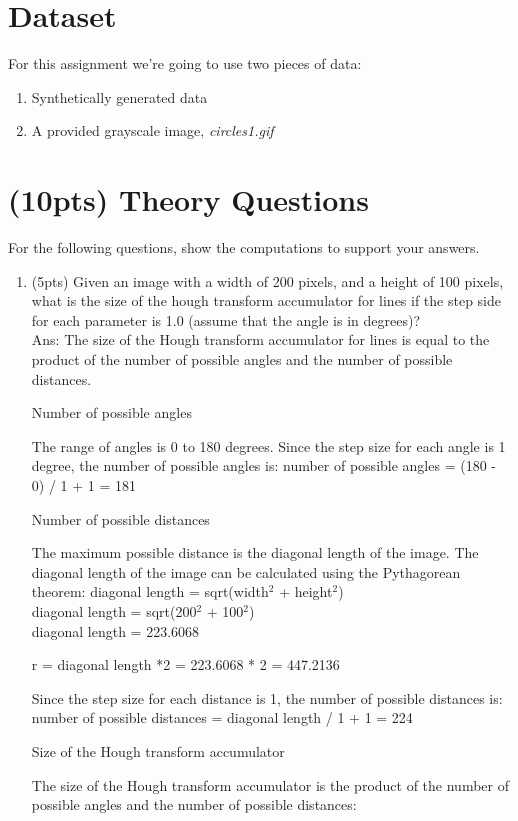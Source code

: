 \documentclass[12pt]{article}
\begin{document}
\newpage
\section*{Dataset}
For this assignment we're going to use two pieces of data:
\begin{enumerate}
\item Synthetically generated data
\item A provided grayscale image,  \emph{circles1.gif}
\end{enumerate}

\newpage
\section{(10pts) Theory Questions}
\noindent
For the following questions, show the computations to support your answers.
\begin{enumerate}
\item (5pts) Given an image with a width of 200 pixels, and a height of 100 pixels, what is the size of the hough transform accumulator for lines if the step side for each parameter is 1.0 (assume that the angle is in degrees)?\\
Ans: The size of the Hough transform accumulator for lines is equal to the product of the number of possible angles and the number of possible distances.

Number of possible angles

The range of angles is 0 to 180 degrees. Since the step size for each angle is 1 degree, the number of possible angles is:
number of possible angles = (180 - 0) / 1 + 1 = 181

Number of possible distances

The maximum possible distance is the diagonal length of the image. The diagonal length of the image can be calculated using the Pythagorean theorem:
diagonal length = sqrt(width$^2$ + height$^2$)\\
diagonal length = sqrt(200$^2$ + 100$^2$)\\
diagonal length = 223.6068

r = diagonal length *2 = 223.6068 * 2 = 447.2136

Since the step size for each distance is 1, the number of possible distances is: \\
number of possible distances = diagonal length / 1 + 1 = 224


Size of the Hough transform accumulator

The size of the Hough transform accumulator is the product of the number of possible angles and the number of possible distances:


\end{enumerate}
\end{document}
